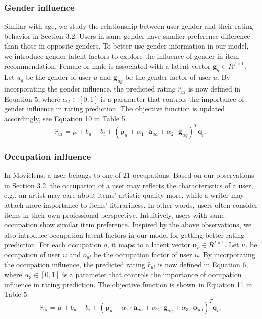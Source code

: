\documentclass{llncs}
\begin{document}
\subsubsection{Gender influence}
	Similar with age, we study the relationship between user gender and their rating behavior in Section 3.2.
	Users in same gender have smaller preference difference than those in opposite genders.
	To better use gender information in our model, we introduce gender latent factors to explore the influence of
	gender in item recommendation.
	Female or male is associated with a latent vector $\mathbf{g}_g\in R^{f\times1}$.
	Let $u_g$ be the gender of user $u$ and $\mathbf{g}_{ug}$ be the gender factor of user $u$.
	By incorporating the gender influence, the predicted rating $\hat{r}_{ui}$ is now defined in Equation 5, where
	$\alpha_2\in[0,1]$ is a parameter that controls the importance of gender influence in rating prediction.
	The objective function is updated accordingly, see Equation 10 in Table 5.
	\begin{equation}\label{4}
		\hat{r}_{ui}=\mu+b_u+b_i+(\mathbf{p}_u+\alpha_1\cdot \mathbf{a}_{ua}+\alpha_2\cdot \mathbf{g}_{ug})^T\mathbf{q}_i,
	\end{equation}
	
\subsubsection{Occupation influence}
	In Movielens, a user belongs to one of 21 occupations. Based on our observations in Section 3.2,
	the occupation of a user may reflects the
	characteristics of a user, e.g., an artist may care about items' artistic quality more, while a writer
	may attach more importance to items' literariness. In other words, users often consider items in their own professional perspective.
	Intuitively, users with same occupation show similar item preference.
	Inspired by the above observations, we also introduce occupation latent factors in our model for getting better rating prediction.
	For each occupation $o$, it maps to a latent vector $\mathbf{o}_o\in R^{f\times1}$.
	Let $u_t$ be occupation of user $u$ and $o_{ut}$ be the occupation factor of user $u$.
	By incorporating the occupation influence, the predicted rating $\hat{r}_{ui}$ is now defined in Equation 6, where
	$\alpha_3\in[0,1]$ is a parameter that controls the importance of occupation influence in rating prediction.
	The objective function is shown in Equation 11 in Table 5.
	\begin{equation}\label{5}
		\hat{r}_{ui}=\mu+b_u+b_i+(\mathbf{p}_u+\alpha_1\cdot \mathbf{a}_{ua}+\alpha_2\cdot \mathbf{g}_{ug}+\alpha_3\cdot \mathbf{o}_{uo})^T\mathbf{q}_i,
	\end{equation}
\end{document}
